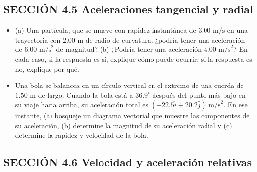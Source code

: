 \documentclass[11pt,a4paper]{article}
\begin{document}
\newpage

\subsection*{SECCIÓN 4.5 Aceleraciones tangencial y radial}

\begin{itemize}
    \item[\textbf{23.}] (a) Una partícula, que se mueve con rapidez instantánea de $3.00 \text{ m/s}$ en una trayectoria con $2.00 \text{ m}$ de radio de curvatura, ¿podría tener una aceleración de $6.00 \text{ m/s}^2$ de magnitud? (b) ¿Podría tener una aceleración $4.00 \text{ m/s}^2$? En cada caso, si la respuesta es sí, explique cómo puede ocurrir; si la respuesta es no, explique por qué.
    \vspace*{6cm}

    \item[\textbf{24.}] Una bola se balancea en un círculo vertical en el extremo de una cuerda de $1.50 \text{ m}$ de largo. Cuando la bola está a $36.9^\circ$ después del punto más bajo en su viaje hacia arriba, su aceleración total es $(-22.5\hat{i} + 20.2\hat{j}) \text{ m/s}^2$. En ese instante, (a) bosqueje un diagrama vectorial que muestre las componentes de su aceleración, (b) determine la magnitud de su aceleración radial y (c) determine la rapidez y velocidad de la bola.
    \vspace*{8cm}
\end{itemize}

\newpage

\subsection*{SECCIÓN 4.6 Velocidad y aceleración relativas}
\end{document}
